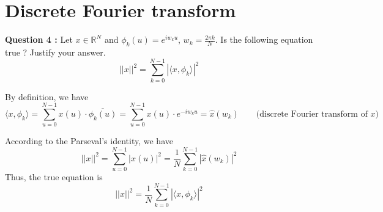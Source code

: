 \documentclass[12pt,a4paper]{article}
\begin{document}
\color{black}

\section{Discrete Fourier transform}

\noindent\textbf{Question 4 :}
Let $x \in \mathbb{R}^N$ and $\phi_k(u) = e^{i w_k u}$, $w_k = \frac{2 \pi k}{N}$. Is the following equation true ? Justify your answer.
$$
||x||^2 = \sum_{k=0}^{N-1} | \langle x, \phi_k \rangle |^2
$$

\color{blue}

By definition, we have
$$
\langle x, \phi_k \rangle = \sum_{u=0}^{N-1} x(u) \cdot \overline{\phi_k(u)} = \sum_{u=0}^{N-1} x(u) \cdot e^{-i w_k u} = \hat{x}(w_k) \qquad \text{(discrete Fourier transform of } x)
$$

According to the Parseval's identity, we have
$$
||x||^2 = \sum_{u=0}^{N-1} |x(u)|^2 = \frac{1}{N} \sum_{k=0}^{N-1} | \hat{x}(w_k) |^2
$$
Thus, the true equation is
$$
||x||^2 = \frac{1}{N} \sum_{k=0}^{N-1} | \langle x, \phi_k \rangle |^2
$$
\end{document}
